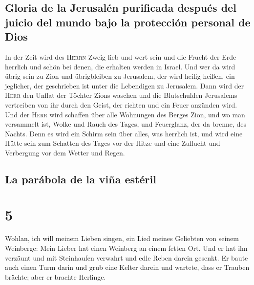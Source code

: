 \hypertarget{gloria-de-la-jerusaluxe9n-purificada-despuuxe9s-del-juicio-del-mundo-bajo-la-protecciuxf3n-personal-de-dios}{%
\subsection{Gloria de la Jerusalén purificada después del juicio del
mundo bajo la protección personal de
Dios}\label{gloria-de-la-jerusaluxe9n-purificada-despuuxe9s-del-juicio-del-mundo-bajo-la-protecciuxf3n-personal-de-dios}}

 In der Zeit wird des \textsc{Herrn} Zweig lieb und wert
sein und die Frucht der Erde herrlich und schön bei denen, die erhalten
werden in Israel.  Und wer da wird übrig sein zu Zion und
übrigbleiben zu Jerusalem, der wird heilig heißen, ein jeglicher, der
geschrieben ist unter die Lebendigen zu Jerusalem.  Dann
wird der \textsc{Herr} den Unflat der Töchter Zions waschen und die
Blutschulden Jerusalems vertreiben von ihr durch den Geist, der richten
und ein Feuer anzünden wird.  Und der \textsc{Herr} wird
schaffen über alle Wohnungen des Berges Zion, und wo man versammelt ist,
Wolke und Rauch des Tages, und Feuerglanz, der da brenne, des Nachts.
Denn es wird ein Schirm sein über alles, was herrlich ist,
 und wird eine Hütte sein zum Schatten des Tages vor der
Hitze und eine Zuflucht und Verbergung vor dem Wetter und Regen.

\hypertarget{la-paruxe1bola-de-la-viuxf1a-estuxe9ril}{%
\subsection{La parábola de la viña
estéril}\label{la-paruxe1bola-de-la-viuxf1a-estuxe9ril}}

\hypertarget{section-4}{%
\section{5}\label{section-4}}

 Wohlan, ich will meinem Lieben singen, ein Lied meines
Geliebten von seinem Weinberge: Mein Lieber hat einen Weinberg an einem
fetten Ort.  Und er hat ihn verzäunt und mit Steinhaufen
verwahrt und edle Reben darein gesenkt. Er baute auch einen Turm darin
und grub eine Kelter darein und wartete, dass er Trauben brächte; aber
er brachte Herlinge.

